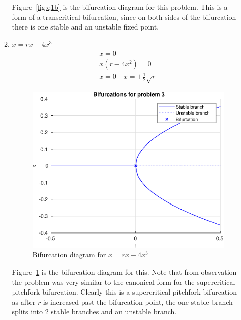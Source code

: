 \documentclass{/home/janmebows/Documents/LatexTemplates/myassignment}
\begin{document}
\begin{enumerate}
\begin{enumerate}
        Figure~\ref{fig:q1b} is the bifurcation diagram for this problem. This is a form of a transcritical bifurcation, since on both sides of the bifurcation there is one stable and an unstable fixed point.


        \item $\dot x = rx - 4x^3$
        \begin{align*}
            \dot x = 0\\
            x(r - 4x^2) = 0\\
            x = 0 \quad x = \pm\frac12\sqrt r
        \end{align*}
        
        \begin{figure}[H]
             \centering
             \label{fig:q1c}
             \includegraphics{ODEsA2Q1c.eps}
             \caption{Bifurcation diagram for $\dot x = rx - 4x^3$}
         \end{figure}
         Figure~\ref{fig:q1c} is the bifurcation diagram for this. Note that from observation the problem was very similar to the canonical form for the supercritical pitchfork bifurcation. Clearly this is a supercritical pitchfork bifurcation as after $r$ is increased past the bifurcation point, the one stable branch splits into 2 stable branches and an unstable branch.

    \end{enumerate}


\end{enumerate}
\end{document}
